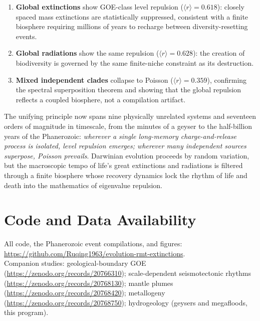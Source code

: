 \documentclass[12pt,a4paper]{article}
\begin{document}
\begin{enumerate}
\item \textbf{Global extinctions} show GOE-class level repulsion ($\langle r\rangle=0.618$): closely spaced mass extinctions are statistically suppressed, consistent with a finite biosphere requiring millions of years to recharge between diversity-resetting events.
\item \textbf{Global radiations} show the same repulsion ($\langle r\rangle=0.628$): the creation of biodiversity is governed by the same finite-niche constraint as its destruction.
\item \textbf{Mixed independent clades} collapse to Poisson ($\langle r\rangle=0.359$), confirming the spectral superposition theorem and showing that the global repulsion reflects a coupled biosphere, not a compilation artifact.
\end{enumerate}

The unifying principle now spans nine physically unrelated systems and seventeen orders of magnitude in timescale, from the minutes of a geyser to the half-billion years of the Phanerozoic: \emph{wherever a single long-memory charge-and-release process is isolated, level repulsion emerges; wherever many independent sources superpose, Poisson prevails}. Darwinian evolution proceeds by random variation, but the macroscopic tempo of life's great extinctions and radiations is filtered through a finite biosphere whose recovery dynamics lock the rhythm of life and death into the mathematics of eigenvalue repulsion.

\section*{Code and Data Availability}
All code, the Phanerozoic event compilations, and figures: \url{https://github.com/Ruqing1963/evolution-rmt-extinctions}.\\
Companion studies: geological-boundary GOE (\url{https://zenodo.org/records/20766310}); scale-dependent seismotectonic rhythms (\url{https://zenodo.org/records/20768130}); mantle plumes (\url{https://zenodo.org/records/20768420}); metallogeny (\url{https://zenodo.org/records/20768750}); hydrogeology (geysers and megafloods, this program).
\end{document}
